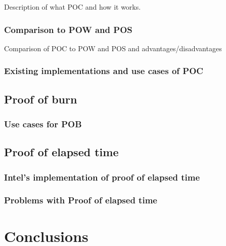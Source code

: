 \documentclass{acm_proc_article-sp}
\begin{document}
Description of what POC and how it works.


\subsubsection{Comparison to POW and POS}

Comparison of POC to POW and POS and advantages/disadvantages


\subsubsection{Existing implementations and use cases of POC}


\subsection{Proof of burn}


\subsubsection{Use cases for POB}


\subsection{Proof of elapsed time}


\subsubsection{Intel's implementation of proof of elapsed time}


\subsubsection{Problems with Proof of elapsed time}


\section{Conclusions}






\end{document}
